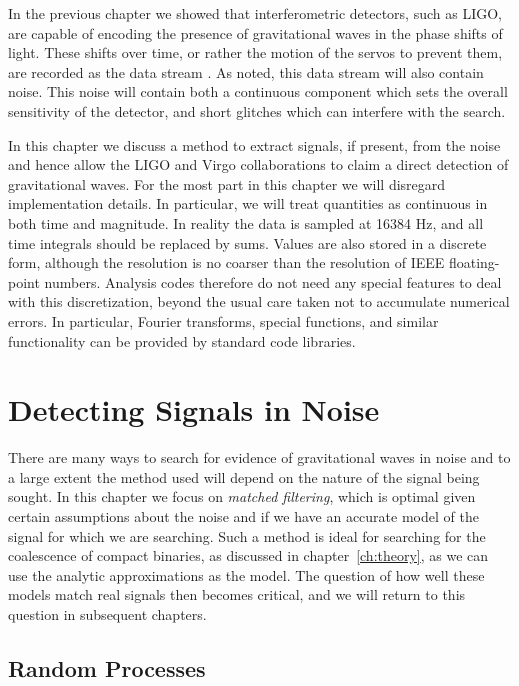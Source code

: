 In the previous chapter we showed that interferometric detectors, such
as LIGO, are capable of encoding the presence of gravitational waves
in the phase shifts of light.  These shifts over time, or rather the
motion of the servos to prevent them, are recorded as the data stream
\darmerr.  As noted, this data stream will also contain noise.  This
noise will contain both a continuous component which sets the overall
sensitivity of the detector, and short glitches which can interfere
with the search.

In this chapter we discuss a method to extract signals, if present,
from the noise and hence allow the LIGO and Virgo collaborations to
claim a direct detection of gravitational waves.  For the most part in
this chapter we will disregard implementation details.  In particular,
we will treat quantities as continuous in both time and magnitude.  In
reality the data is sampled at 16384 Hz, and all time integrals
should be replaced by sums.  Values are also stored in a discrete
form, although the resolution is no coarser than the resolution of
IEEE floating-point numbers.  Analysis codes therefore do not need any
special features to deal with this discretization, beyond the usual
care taken not to accumulate numerical errors.  In particular, Fourier
transforms, special functions, and similar functionality can be
provided by standard code libraries.



\section{Detecting Signals in Noise}
\label{sec:ihope_match_filter}

There are many ways to search for evidence of gravitational waves in
noise and to a large extent the method used will depend on the nature
of the signal being sought.  In this chapter we focus on \emph{matched
filtering}, which is optimal given certain assumptions about the noise
and if we have an accurate model of the signal for which we are
searching.  Such a method is ideal for searching for the coalescence
of compact binaries, as discussed in chapter~\ref{ch:theory}, as we
can use the analytic approximations as the model.  The question of how
well these models match real signals then becomes critical, and 
we will return to this question in subsequent chapters.

\subsection{Random Processes}
\label{ssec:random_processes}

